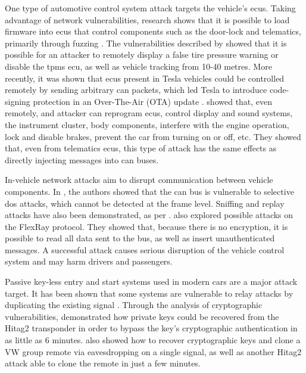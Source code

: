 One type of automotive control system attack targets the vehicle’s \glspl{ecu}. Taking advantage of network vulnerabilities, research shows that it is possible to load firmware into \glspl{ecu} that control components such as the door-lock and telematics, primarily through fuzzing \citep{Koscher2010}. The vulnerabilities described by \cite{rouf2010security} showed that it is possible for an attacker to remotely display a false tire pressure warning or disable the \gls{tpms} \gls{ecu}, as well as vehicle tracking from 10-40 metres. More recently, it was shown that \glspl{ecu} present in Tesla vehicles could be controlled remotely by sending arbitrary \gls{can} packets, which led Tesla to introduce code-signing protection in an Over-The-Air (OTA) update \citep{Nie2017}. \cite{miller2015remote} showed that, even remotely, and attacker can reprogram \glspl{ecu}, control display and sound systems, the instrument cluster, body components, interfere with the engine operation, lock and disable brakes, prevent the car from turning on or off, etc. They showed that, even from telematics \glspl{ecu}, this type of attack has the same effects as directly injecting messages into \gls{can} buses.\par
In-vehicle network attacks aim to disrupt communication between vehicle components. In \citep{Palanca2017}, the authors showed that the \gls{can} bus is vulnerable to selective \gls{dos} attacks, which cannot be detected at the frame level. Sniffing and replay attacks have also been demonstrated, as per \cite{hoppe2009applying}. \cite{nilsson2009first} also explored possible attacks on the FlexRay protocol. They showed that, because there is no encryption, it is possible to read all data sent to the bus, as well as insert unauthenticated messages. A successful attack causes serious disruption of the vehicle control system and may harm drivers and passengers.\par
Passive key-less entry and start systems used in modern cars are a major attack target. It has been shown that some systems are vulnerable to relay attacks by duplicating the existing signal \citep{francillon2011relay}. Through the analysis of cryptographic vulnerabilities, \cite{verdult2012gone} demonstrated how private keys could be recovered from the Hitag2 transponder in order to bypass the key's cryptographic authentication in as little as 6 minutes. \cite{garcia2016lock} also showed how to recover cryptographic keys and clone a VW group remote via eavesdropping on a single signal, as well as another Hitag2 attack able to clone the remote in just a few minutes.\par

